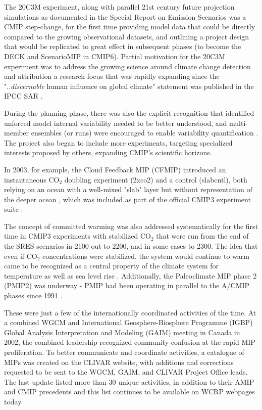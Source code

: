 \documentclass[manuscript]{copernicus}
\begin{document}
The 20C3M experiment, along with parallel 21st century future projection simulations as documented in the Special Report on Emission Scenarios \citep[SRES 2000-2100;][]{nakicenovic_summary_2000} was a CMIP step-change, for the first time providing model data that could be directly compared to the growing observational datasets, and outlining a project design that would be replicated to great effect in subsequent phases (to become the DECK and ScenarioMIP in CMIP6). Partial motivation for the 20C3M experiment was to address the growing science around climate change detection and attribution \citep[DandA; e.g.,][]{santer_detection_1996-1,hegerl_20c3m_2003} a research focus that was rapidly expanding since the "..\emph{discernable} human influence on global climate" statement was published in the IPCC SAR \citep{santer_detection_1996}.

During the planning phase, there was also the explicit recognition that identified unforced model internal variability needed to be better understood, and multi-member ensembles (or runs) were encouraged to enable variability quantification \citep{meehl_wcrp_2007}. The project also began to include more experiments, targeting specialized interests proposed by others, expanding CMIP's scientific horizons.

In 2003, for example, the Cloud Feedback MIP (CFMIP) introduced an instantaneous CO$_{2}$ doubling experiment (2xco2) and a control (slabcntl), both relying on an ocean with a well-mixed "slab" layer but without representation of the deeper ocean \citep{manabe_co2-climate_1979}, which was included as part of the official CMIP3 experiment suite \citep[see also \autoref{tab:tabAppA1-MIPExperiments};][]{mcavaney_cloud_2003,webb_cloud_2017}.

The concept of committed warming was also addressed systematically for the first time in CMIP3 experiments with stabilized CO$_{2}$ that were run from the end of the SRES scenarios in 2100 out to 2200, and in some cases to 2300. The idea that even if CO$_{2}$ concentrations were stabilized, the system would continue to warm came to be recognized as a central property of the climate system for temperature as well as sea level rise \citep{meehl_how_2005}. Additionally, the Paleoclimate MIP phase 2 (PMIP2) was underway - PMIP had been operating in parallel to the A/CMIP phases since 1991 \citep{villwock_6th_2003,braconnot_paleoclimate_2011,joussame_pmip_2021}.

These were just a few of the internationally coordinated activities of the time. At a combined WGCM and International Geosphere-Biosphere Programme (IGBP) Global Analysis Interpretation and Modeling (GAIM) meeting in Canada in 2002, the combined leadership recognized community confusion at the rapid MIP proliferation. To better communicate and coordinate activities, a catalogue of MIPs was created on the CLIVAR website, with additions and corrections requested to be sent to the WGCM, GAIM, and CLIVAR Project Office leads. The last update listed more than 30 unique activities, in addition to their AMIP and CMIP precedents \citep{meehl_catalogue_2003} and this list continues to be available on WCRP webpages today.
\end{document}
